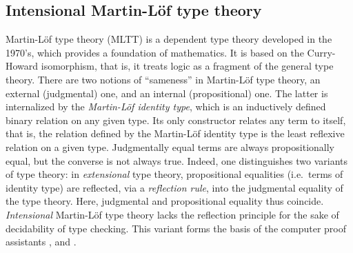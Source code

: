 \documentclass[a4paper,USenglish]{lipics}
\begin{document}
 \subsection{Intensional Martin-Löf type theory}\label{sec:mltt}
 Martin-Löf type theory (MLTT) \parencite{martin_lof} is a dependent type theory developed in the 1970's, which provides a foundation of mathematics.
 It is based on the Curry-Howard isomorphism, that is, it treats logic as a fragment of the general type theory.
 There are two notions of \enquote{sameness} in Martin-Löf type theory, an external (judgmental) one, and an internal (propositional) one.
 The latter is internalized by  the \emph{Martin-Löf identity type}, which is an inductively defined binary relation on any given type.
 Its only constructor relates any term to itself, that is, the relation defined by the Martin-Löf identity type is the least reflexive relation on a given type.
 Judgmentally equal terms are always propositionally equal, but the converse is not always true.
 Indeed, one distinguishes two variants of type theory: in \emph{extensional} type theory, propositional equalities (i.e.\ terms of identity type)
 are reflected, via a \emph{reflection rule}, into the judgmental equality of the type theory.  
 Here, judgmental and propositional equality thus coincide.
 \emph{Intensional} Martin-L\"of type theory  lacks the reflection principle for the sake of decidability of type checking. 
 This variant forms the basis of the computer proof assistants \coq, \matita and \agda.

 
\begin{comment}
 \subsection{(Non-)wellfounded trees: (co)inductive types}
 
 A \emph{tree} is abstractly given by its \emph{root} and its \emph{subtrees}, which we think of as being attached to the root.
 Subtrees are themselves trees, again consisting of a root and attached subtrees.
 The roots of the various subtrees occurring in a tree are called \emph{nodes}. Among those, there are nodes without any subtrees, which are called \emph{leaves}.
 
 
 
 

 A fundamental property of a tree is \emph{finiteness}. A tree is finite if it does not have a subtree of infinite length. 

 An inductive set/type specifies a set/type of trees of given shape, i.e.\ it specifies the set/type of nodes and, for each node, the number (cardinality) of subtrees 
 attached to that node. The trees defined inductively are \emph{finite} trees, i.e.\ no infinite chain of subtrees occurs in such a tree.
\end{comment}
 
\end{document}
